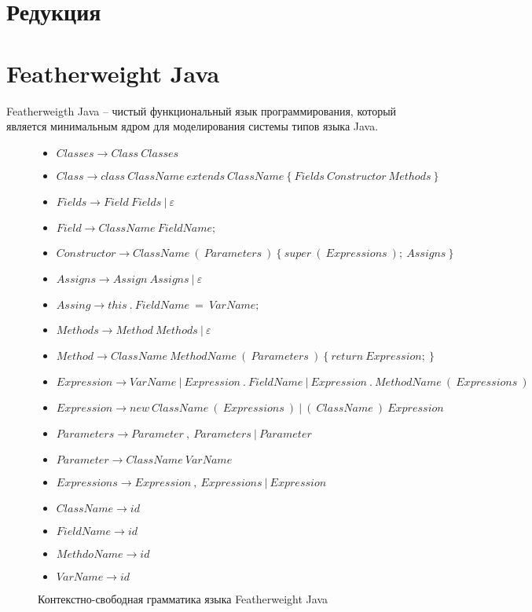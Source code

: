 \section{Редукция}

\section{Featherweight Java}
Featherweigth Java -- чистый функциональный язык программирования,
который является минимальным ядром для моделирования системы типов языка Java.
\begin{figure}[H]
\begin{itemize}
    \item[] $Classes \rightarrow Class\ Classes$
    \item[] $Class \rightarrow class\ ClassName\ extends\ ClassName\ \{\ Fields\ Constructor\ Methods\ \}$
    \item[] $Fields \rightarrow Field\ Fields\ |\ \varepsilon$
    \item[] $Field \rightarrow ClassName\ FieldName;$
    \item[] $Constructor \rightarrow ClassName\ (\ Parameters\ )\ \{\ super\ (\ Expressions\ );\ Assigns\ \}$
    \item[] $Assigns \rightarrow Assign\ Assigns\ |\ \varepsilon$
    \item[] $Assing \rightarrow this\ .\ FieldName\ =\ VarName;$    
    \item[] $Methods \rightarrow Method\ Methods\ |\ \varepsilon$
    \item[] $Method \rightarrow ClassName\ MethodName\ (\ Parameters\ )\ \{\ return\ Expression;\ \}$
    \item[] $Expression \rightarrow VarName\ |\ Expression\ .\ FieldName\ |\ Expression\ .\ MethodName\ (\ Expressions\ )$
    \item[] $Expression \rightarrow new\ ClassName\ (\ Expressions\ )\ |\ (\ ClassName\ )\ Expression$
    \item[] $Parameters \rightarrow Parameter\ ,\ Parameters\ |\ Parameter$
    \item[] $Parameter \rightarrow ClassName\ VarName$
    \item[] $Expressions \rightarrow Expression\ ,\ Expressions\ |\ Expression$
    \item[] $ClassName \rightarrow id$
    \item[] $FieldName \rightarrow id$
    \item[] $MethdoName \rightarrow id$
    \item[] $VarName \rightarrow id$
    \caption{Контекстно-свободная грамматика языка Featherweight Java}
    \label{cf-fj}
\end{itemize}
\end{figure}
